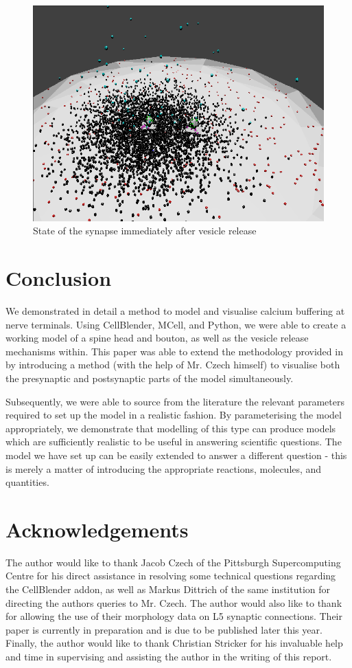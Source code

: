 \documentclass[a4paper]{article}
\begin{document}
\begin{figure}[H]
   \centering
   \includegraphics[scale = 0.4]{fig2.png} %
   \caption{State of the synapse immediately after vesicle release}
   \label{fig2}
\end{figure}

\section{Conclusion}
We demonstrated in detail a method to model and visualise calcium buffering at nerve terminals. Using CellBlender, MCell, and Python, we were able to create a working model of a spine head and bouton, as well as the vesicle release mechanisms within. This paper was able to extend the methodology provided in \cite{Czech:MethodsMolBiol:2009} by introducing a method (with the help of Mr. Czech himself) to visualise both the presynaptic and postsynaptic parts of the model simultaneously.

Subsequently, we were able to source from the literature the relevant parameters required to set up the model in a realistic fashion. By parameterising the model appropriately, we demonstrate that modelling of this type can produce models which are sufficiently realistic to be useful in answering scientific questions. The model we have set up can be easily extended to answer a different question - this is merely a matter of introducing the appropriate reactions, molecules, and quantities.

\section{Acknowledgements}
The author would like to thank Jacob Czech of the Pittsburgh Supercomputing Centre for his direct assistance in resolving some technical questions regarding the CellBlender addon, as well as Markus Dittrich of the same institution for directing the authors queries to Mr. Czech. The author would also like to thank \cite{Rollehagen::2015} for allowing the use of their morphology data on L5 synaptic connections. Their paper is currently in preparation and is due to be published later this year. Finally, the author would like to thank Christian Stricker for his invaluable help and time in supervising and assisting the author in the writing of this report.

{}

\end{document}
